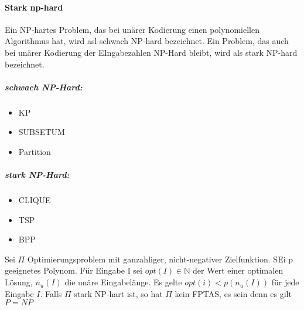 \documentclass[a4paper, 10pt]{article}
\theoremstyle{definition}
\begin{document}
\paragraph{Stark np-hard} Ein NP-hartes Problem, das bei unärer Kodierung einen polynomiellen Algorithmus hat, wird asl schwach NP-hard bezeichnet. Ein Problem, das auch bei unärer Kodierung der EIngabezahlen NP-Hard bleibt, wird als stark NP-hard bezeichnet.
\subparagraph{schwach NP-Hard:}
\begin{itemize}
    \item KP
    \item SUBSETUM
    \item Partition
\end{itemize}
\subparagraph{stark NP-Hard:}
\begin{itemize}
    \item CLIQUE
    \item TSP
    \item BPP
\end{itemize}
Sei $\Pi$ Optimierungsproblem mit ganzahliger, nicht-negativer Zielfunktion. SEi p geeignetes Polynom. Für Eingabe I sei $opt(I)\in\mathbb{N}$ der Wert einer optimalen Lösung, $n_u(I)$ die unäre Eingabelänge. Es gelte $opt(i)<p(n_u(I))$ für jede Eingabe $I$. Falls $\Pi$ stark NP-hart ist, so hat $\Pi$ kein FPTAS, es sein denn es gilt $P=NP$
\end{document}
